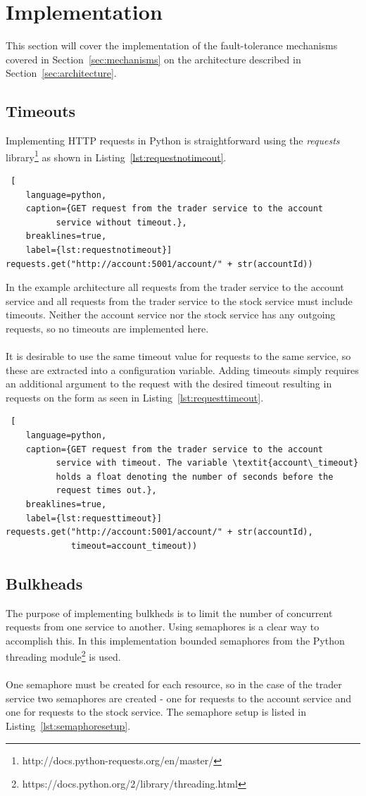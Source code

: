 \section{Implementation}\label{sec:implementation}
This section will cover the implementation of the fault-tolerance mechanisms
covered in Section~\ref{sec:mechanisms} on the architecture described in
Section~\ref{sec:architecture}.

\subsection{Timeouts}
Implementing HTTP requests in Python is straightforward using the
\textit{requests}
library\footnote{http://docs.python-requests.org/en/master/} as shown
in Listing~\ref{lst:requestnotimeout}.

\begin{lstlisting} [
	language=python,
	caption={GET request from the trader service to the account
          service without timeout.},
	breaklines=true,
	label={lst:requestnotimeout}]
requests.get("http://account:5001/account/" + str(accountId))
\end{lstlisting}
In the example architecture all requests from the
trader service to the account service and all requests from the trader
service to the stock service must include timeouts. Neither the
account service nor the stock service has any outgoing requests, so no
timeouts are implemented here.
\\\\
It is desirable to use the same timeout value for requests to the same
service, so these are extracted into a configuration variable. Adding
timeouts simply requires an additional argument to the request with
the desired timeout resulting in requests on the form as seen in
Listing~\ref{lst:requesttimeout}.

\begin{lstlisting} [
	language=python,
	caption={GET request from the trader service to the account
          service with timeout. The variable \textit{account\_timeout}
          holds a float denoting the number of seconds before the
          request times out.},
	breaklines=true,
	label={lst:requesttimeout}]
requests.get("http://account:5001/account/" + str(accountId),
             timeout=account_timeout))
\end{lstlisting}

\subsection{Bulkheads}
The purpose of implementing bulkheds is to limit the number of
concurrent requests from one service to another. Using semaphores is a
clear way to accomplish this. In this implementation bounded
semaphores from the Python threading
module\footnote{https://docs.python.org/2/library/threading.html} is
used.
\\\\
One semaphore must be created for each resource, so in the case of the
trader service two semaphores are created - one for requests to the
account service and one for requests to the stock service. The
semaphore setup is listed in Listing~\ref{lst:semaphoresetup}.

